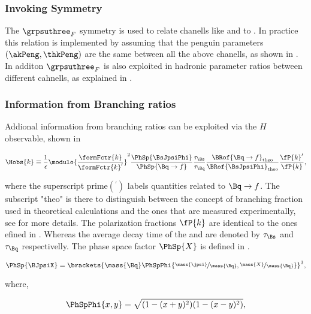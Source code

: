 \subsubsection{Invoking \grpsuthree Symmetry}
The $\grpsuthree_{F}$ symmetry is used to relate chanells like \BsJpsiKst and \BsJpsiRho to \BsJpsiPhi.
In practice this relation is implemented by assuming that the penguin parameters $(\akPeng,\thkPeng)$
are the same between all the above chanells, as shown in . In additon $\grpsuthree_{F}$
is also exploited in hadronic parameter ratios between different cahnells, as explained in .

\subsubsection{Information from Branching ratios}
Addional information from branching ratios can be exploited via the $H$ observable, shown in 

\begin{equation}
\centering
  \Hobs{k} \equiv   \frac{1}{\epsilon}
            \modulo{\frac{\formFctr{k}}{\formFctr{k}'}}^2
                    \frac{\PhSp{\BsJpsiPhi}} {\PhSp{\Bq\to f}}
                    \frac{\tau_{\Bs}}{\tau_{\Bq}}
                    \frac{\BRof{\Bq\to f}_{\rm theo}}{\BRof{\BsJpsiPhi}_{\rm theo}}
                    \frac{\fP{k}'}{{\fP{k}}},
\label{hobs_def}
\end{equation}

\noindent where the superscript prime$({}^\prime)$ labels quantities related to $\Bq\to f$. The subscript "theo" is there to distinguish
between the concept of branching fraction used in theoretical calculations and the ones that are measured experimentally,
see  for more details. The polarization fractions $\fP{k}$ are identical to the ones
efined in . Whereas the average decay time of the \Bs and \Bq are denoted by $\tau_{\Bs}$ and $\tau_{\Bq}$
respectivelly. The phase space factor $\PhSp{X}$ is defined in .

\begin{equation}
\centering
   \PhSp{\BJpsiX}  = \brackets{ \mass{\Bq} \PhSpPhi{ \nicefrac{\mass{\jpsi}}{\mass{\Bq}}, \nicefrac{\mass{X}}{\mass{\Bq}}  } }^3,
\label{phase_space_eq_def}
\end{equation}

\noindent where,

\begin{equation}
\centering
   \PhSpPhi{x,y} = \sqrt{ (1-(x+y)^2)(1-(x-y)^2) },
\label{phase_space_phi_eq_def}
\end{equation}


